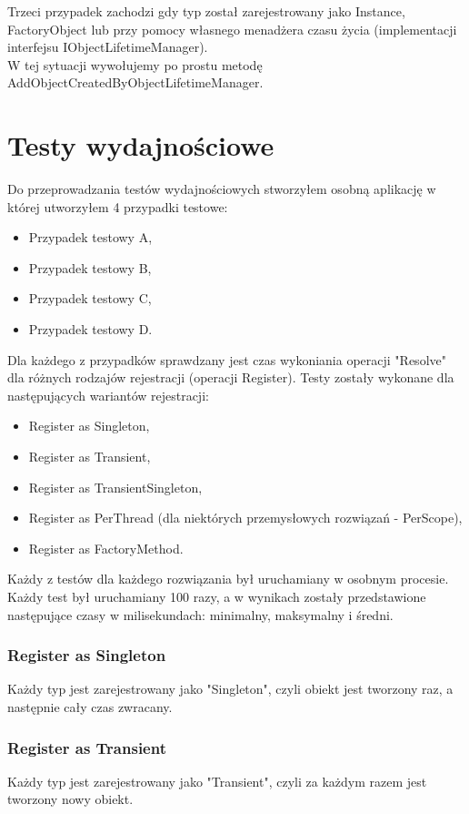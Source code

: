 \documentclass[12pt]{article}
\begin{document}
Trzeci przypadek zachodzi gdy typ został zarejestrowany jako Instance, FactoryObject lub przy pomocy własnego menadżera czasu życia (implementacji interfejsu IObjectLifetimeManager).\\
W tej sytuacji wywołujemy po prostu metodę AddObjectCreatedByObjectLifetimeManager.



\clearpage
\section{Testy wydajnościowe}
Do przeprowadzania testów wydajnościowych stworzyłem osobną aplikację w której utworzyłem 4 przypadki testowe:
\begin{itemize}
	\item Przypadek testowy A,
	\item Przypadek testowy B,
	\item Przypadek testowy C,
	\item Przypadek testowy D.
\end{itemize}
Dla każdego z przypadków sprawdzany jest czas wykoniania operacji "Resolve" dla różnych rodzajów rejestracji (operacji Register). Testy zostały wykonane dla następujących wariantów rejestracji:
\begin{itemize}
	\item Register as Singleton,
	\item Register as Transient,
	\item Register as TransientSingleton,
	\item Register as PerThread (dla niektórych przemysłowych rozwiązań - PerScope),
	\item {\color{red}Register as FactoryMethod.}
\end{itemize}
Każdy z testów dla każdego rozwiązania był uruchamiany w osobnym procesie. Każdy test był uruchamiany 100 razy, a w wynikach zostały przedstawione następujące czasy w milisekundach: minimalny, maksymalny i średni.

\subsubsection{Register as Singleton}
Każdy typ jest zarejestrowany jako "Singleton", czyli obiekt jest tworzony raz, a następnie cały czas zwracany.

\subsubsection{Register as Transient}
Każdy typ jest zarejestrowany jako "Transient", czyli za każdym razem jest tworzony nowy obiekt.
\end{document}
